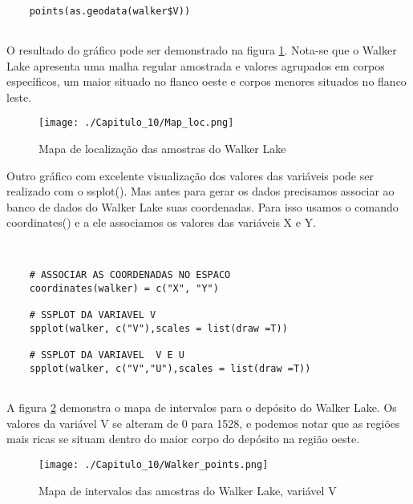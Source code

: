 \begin{scriptsize}
	\estiloR
	\begin{lstlisting}[]
	
	points(as.geodata(walker$V))
	
	\end{lstlisting}
\end{scriptsize}

O resultado do gráfico pode ser demonstrado na figura \ref{localizacao}. Nota-se que o Walker Lake apresenta uma malha regular amostrada e valores agrupados em corpos específicos, um maior situado no flanco oeste e corpos menores situados no flanco leste.

\FloatBarrier
 \begin{figure}[H]
	\centering
	\texttt{[image: ./Capitulo\_10/Map\_loc.png]}	
	\caption{Mapa de localização das amostras do Walker Lake}
	\label{localizacao}
\end{figure}
\FloatBarrier

Outro gráfico com excelente visualização dos valores das variáveis pode ser realizado com o ssplot(). Mas antes para gerar os dados precisamos associar ao banco de dados do Walker Lake suas coordenadas. Para isso usamos o comando coordinates() e a ele associamos os valores das variáveis X e Y.


\begin{scriptsize}
	\estiloR
	\begin{lstlisting}[]
	
	
	# ASSOCIAR AS COORDENADAS NO ESPACO
	coordinates(walker) = c("X", "Y")
	
	# SSPLOT DA VARIAVEL V 
	spplot(walker, c("V"),scales = list(draw =T))
	
	# SSPLOT DA VARIAVEL  V E U 
	spplot(walker, c("V","U"),scales = list(draw =T))
	
	\end{lstlisting}
\end{scriptsize}

A figura \ref{mapas_intervalo} demonstra o mapa de intervalos para o depósito do Walker Lake. Os valores da variável V se alteram de 0 para 1528, e podemos notar que as regiões mais ricas se situam dentro do maior corpo do depósito na região oeste.

\FloatBarrier
 \begin{figure}[H]
	\centering
	\texttt{[image: ./Capitulo\_10/Walker\_points.png]}	
	\caption{Mapa de intervalos das amostras do Walker Lake, variável V}
	\label{mapas_intervalo}
\end{figure}
\FloatBarrier

